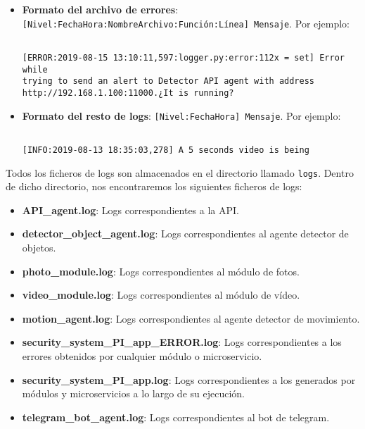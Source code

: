 \begin{itemize}
\item \textbf{Formato del archivo de errores}: \texttt{[Nivel:FechaHora:NombreArchivo:Función:Línea] Mensaje}. Por ejemplo:

\vspace{-1cm}

\begin{verbatim}

[ERROR:2019-08-15 13:10:11,597:logger.py:error:112x = set] Error while
trying to send an alert to Detector API agent with address 
http://192.168.1.100:11000.¿It is running?

\end{verbatim}


\vspace{-1cm}

\item \textbf{Formato del resto de logs}: \texttt{[Nivel:FechaHora] Mensaje}. Por ejemplo:

\vspace{-1.2cm}

\begin{verbatim}

[INFO:2019-08-13 18:35:03,278] A 5 seconds video is being 

\end{verbatim}

\end{itemize}

\vspace{-1.2cm}

Todos los ficheros de logs son almacenados en el directorio llamado \texttt{logs}. Dentro de dicho directorio, nos encontraremos los siguientes ficheros de logs:

\vspace{-0.4cm}

\begin{itemize}
\item \textbf{API\_agent.log}: Logs correspondientes a la API.
\item \textbf{detector\_object\_agent.log}: Logs correspondientes al agente detector de objetos.
\item \textbf{photo\_module.log}: Logs correspondientes al módulo de fotos.
\item \textbf{video\_module.log}: Logs correspondientes al módulo de vídeo.
\item \textbf{motion\_agent.log}: Logs correspondientes al agente detector de movimiento.
\item \textbf{security\_system\_PI\_app\_ERROR.log}: Logs correspondientes a los errores obtenidos por cualquier módulo o microservicio.
\item \textbf{security\_system\_PI\_app.log}: Logs correspondientes a los generados por módulos y microservicios a lo largo de su ejecución.
\item \textbf{telegram\_bot\_agent.log}: Logs correspondientes al bot de telegram.

\end{itemize}

